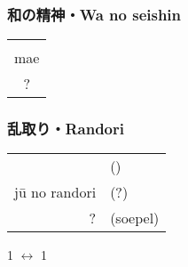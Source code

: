 \subsubsection{和の精神・Wa no seishin}
\begin{table}[H]
\begin{center}
\begin{tabular}{c}
    \ruby{}{}\\
    mae\\
    ?
\end{tabular}
\end{center}
\label{kyuu_3_wa_no_seishin}
\end{table}

\subsubsection{乱取り・Randori}
\begin{table}[H]
\begin{center}
\begin{tabular}{rl}
    \ruby{}{} & (\ruby{}{})\\
    j\={u} no randori & (?)\\
    ? & (soepel)
\end{tabular}
\end{center}
\label{kyuu_3_randori}
\end{table}
\begin{center}
    1 $\leftrightarrow$ 1
\end{center}
